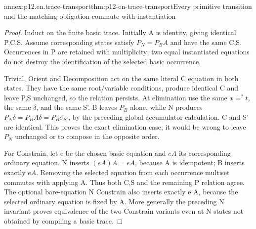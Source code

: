 \begin{annexitem}{annex:p12.en.trace-transport}{thm:p12-en-trace-transport}{Every primitive transition and the matching obligation commute with instantiation}
\begin{proof}
Induct on the finite basic trace. Initially A is identity, giving
identical P,C,S. Assume corresponding states satisfy
\(P_N=P_B A\) and have the same C,S. Occurrences in P are
retained with multiplicity; two equal instantiated equations do
not destroy the identification of the selected basic occurrence.

Trivial, Orient and Decomposition act on the same literal C
equation in both states. They have the same root/variable conditions,
produce identical C and leave P,S unchanged, so the relation persists.
At elimination use the same \(x=^{?}t\), the same \(\delta\),
and the same S'. B leaves \(P_B\) alone, while N produces
\(P_N\delta=P_B A\delta=P_B\sigma_{S'}\), by the preceding
global accumulator calculation. C and S' are identical. This proves
the exact elimination case; it would be wrong to leave \(P_N\)
unchanged or to compose in the opposite order.

For Constrain, let e be the chosen basic equation and \(e A\)
its corresponding ordinary equation. N inserts
\((e A)A=e A\), because A is idempotent; B inserts exactly
\(e A\). Removing the selected equation from each occurrence
multiset commutes with applying A. Thus both C,S and the remaining
P relation agree.
The optional bare-equation N Constrain also inserts exactly e A,
because the selected ordinary equation is fixed by A. More generally
the preceding N invariant proves equivalence of the two Constrain
variants even at N states not obtained by compiling a basic trace.


\end{proof}
\end{annexitem}
